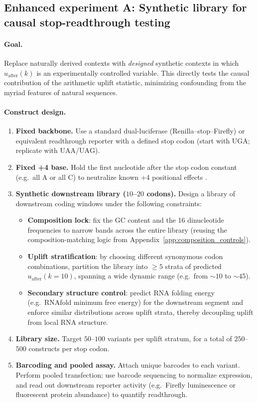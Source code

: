 \subsection{Enhanced experiment A: Synthetic library for causal stop-readthrough testing}
\label{app:bio_exp_a_synthetic}

\paragraph{Goal.}
Replace naturally derived contexts with \emph{designed} synthetic contexts in which $u_{\mathrm{after}}(k)$ is an experimentally controlled variable.
This directly tests the causal contribution of the arithmetic uplift statistic, minimizing confounding from the myriad features of natural sequences.

\paragraph{Construct design.}
\begin{enumerate}
\item \textbf{Fixed backbone.}
Use a standard dual-luciferase (Renilla--stop--Firefly) or equivalent readthrough reporter with a defined stop codon (start with $\mathrm{UGA}$; replicate with $\mathrm{UAA}$/$\mathrm{UAG}$).
\item \textbf{Fixed +4 base.}
Hold the first nucleotide after the stop codon constant (e.g.\ all $\mathrm{A}$ or all $\mathrm{C}$) to neutralize known +4 positional effects \cite{TateBrownPoole1996,McCaughanBrownDalphinBerryTate1995}.
\item \textbf{Synthetic downstream library ($10$--$20$ codons).}
Design a library of downstream coding windows under the following constraints:
  \begin{itemize}
  \item \textbf{Composition lock}: fix the GC content and the 16 dinucleotide frequencies to narrow bands across the entire library (reusing the composition-matching logic from Appendix~\ref{app:composition_controls}).
  \item \textbf{Uplift stratification}: by choosing different synonymous codon combinations, partition the library into $\ge 5$ strata of predicted $u_{\mathrm{after}}(k=10)$, spanning a wide dynamic range (e.g.\ from $\sim 10$ to $\sim 45$).
  \item \textbf{Secondary structure control}: predict RNA folding energy (e.g.\ RNAfold minimum free energy) for the downstream segment and enforce similar distributions across uplift strata, thereby decoupling uplift from local RNA structure.
  \end{itemize}
\item \textbf{Library size.}
Target $50$--$100$ variants per uplift stratum, for a total of $250$--$500$ constructs per stop codon.
\item \textbf{Barcoding and pooled assay.}
Attach unique barcodes to each variant.
Perform pooled transfection; use barcode sequencing to normalize expression, and read out downstream reporter activity (e.g.\ Firefly luminescence or fluorescent protein abundance) to quantify readthrough.
\end{enumerate}

